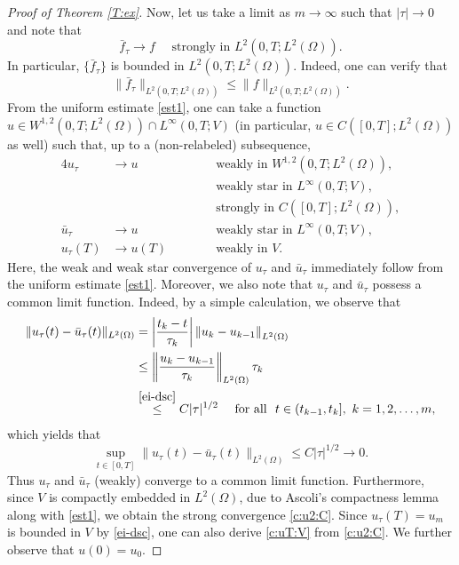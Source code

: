\documentclass[reqno,10pt]{amsart}
\begin{document}
\begin{proof}[Proof of Theorem \ref{T:ex}]
Now, let us take a limit as $m \to \infty$ such that $|\tau| \to 0$ and
note that
\begin{equation}\label{c:f}
 \bar f_\tau \to f \quad \mbox{ strongly in } L^2(0,T;L^2(\Omega)).
\end{equation}
In particular, $\{\bar f_\tau\}$ is bounded in $L^2(0,T;L^2(\Omega))$.
Indeed, one can verify that 
$$
\|\bar f_\tau\|_{L^2(0,T;L^2(\Omega))} \leq \|f\|_{L^2(0,T;L^2(\Omega))}.
$$
From the uniform estimate \eqref{est1}, one can take a function  
$
u\in W^{1,2}(0,T;L^2(\Omega)) \cap L^\infty(0,T;V)
$
(in particular, $u \in C([0,T];L^2(\Omega))$ as well)
such that, up to a (non-relabeled) subsequence,  
\begin{alignat}{4}
u_\tau &\to u &&\mbox{ weakly in } W^{1,2}(0,T;L^2(\Omega)),\label{c:u2:12}\\
 & &&\mbox{ weakly star in }L^\infty(0,T;V),\label{c:uV:i}\\
 & &&\mbox{ strongly in }C([0,T];L^2(\Omega)),\label{c:u2:C}\\
\bar{u}_\tau &\to u &&\mbox{ weakly star in }L^\infty(0,T;V),\label{c:buV:i}\\
u_\tau(T) &\to u(T) \qquad &&\mbox{ weakly in } V.\label{c:uT:V}
\end{alignat}
Here, the weak and weak star convergence of $u_\tau$ and $\bar
u_\tau$ immediately follow from the uniform estimate \eqref{est1}.
Moreover, we also note that $u_\tau$ and $\bar u_\tau$ possess a common
limit function. Indeed, by a simple calculation, we observe that
\begin{align*}
 \|u_\tau(t) - \bar u_\tau(t)\|_{L^2(\Omega)}
&= \left|\dfrac{t_k-t}{\tau_k}\right|\left\| u_k - u_{k-1}
 \right\|_{L^2(\Omega)}\\
&\leq \left\| \dfrac{u_k - u_{k-1}}{\tau_k}\right\|_{L^2(\Omega)} \tau_k\\
&\stackrel{\eqref{ei-dsc}}\leq C |\tau|^{1/2}
\quad \mbox{ for all } \ t \in (t_{k-1}, t_k], \ k = 1,2,\ldots,m,
\end{align*}
which yields that
$$
\sup_{t \in [0,T]}  \|u_\tau(t) - \bar u_\tau(t)\|_{L^2(\Omega)} \leq
C|\tau|^{1/2} \to 0.
$$
Thus $u_\tau$ and $\bar u_\tau$ (weakly) converge to a common limit function.
Furthermore, since $V$ is compactly embedded in $L^2(\Omega)$, due to
Ascoli's compactness lemma along with \eqref{est1}, we obtain the strong convergence \eqref{c:u2:C}.
Since $u_\tau(T) = u_m$ is bounded in $V$ by \eqref{ei-dsc}, one can also derive
\eqref{c:uT:V} from \eqref{c:u2:C}. We further observe that $u(0) = u_0$.


\end{proof}
\end{document}
